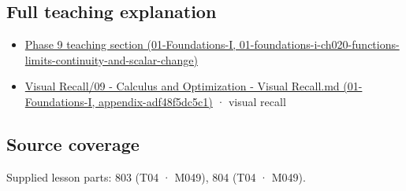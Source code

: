 \subsection{Full teaching explanation}\label{appendix-fecc1847f5a3-full-teaching-explanation}

\begin{itemize}
\tightlist
\item
  \href{../01-Foundations-I/main.pdf\#nameddest=01-foundations-i-ch020-functions-limits-continuity-and-scalar-change}{Phase 9 teaching section (01-Foundations-I, 01-foundations-i-ch020-functions-limits-continuity-and-scalar-change)}
\item
  \href{../01-Foundations-I/main.pdf\#nameddest=appendix-adf48f5dc5c1}{Visual Recall/09 - Calculus and Optimization - Visual Recall.md (01-Foundations-I, appendix-adf48f5dc5c1)} · visual recall
\end{itemize}

\subsection{Source coverage}\label{appendix-fecc1847f5a3-source-coverage}

Supplied lesson parts: 803 (T04 · M049), 804 (T04 · M049).
